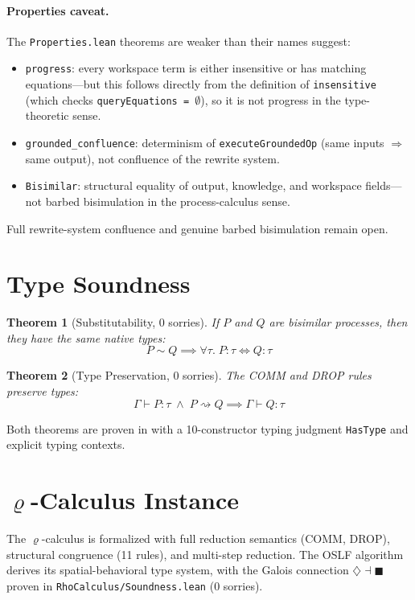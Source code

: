 \documentclass[]{article}
\newtheorem{theorem}{Theorem}
\newcommand{\code}[1]{\texttt{#1}}
\newcommand{\codepath}[1]{\path{#1}}
\newcommand{\rhocalc}{\ensuremath{\varrho}}
\newcommand{\Dia}{\ensuremath{\diamondsuit}}
\newcommand{\Bx}{\ensuremath{\blacksquare}}
\begin{document}
\paragraph{Properties caveat.}
The \code{Properties.lean} theorems are weaker than their names suggest:
\begin{itemize}
\item \code{progress}: every workspace term is either insensitive or has
  matching equations---but this follows directly from the definition of
  \code{insensitive} (which checks \code{queryEquations = $\emptyset$}),
  so it is not progress in the type-theoretic sense.
\item \code{grounded\_confluence}: determinism of \code{executeGroundedOp}
  (same inputs $\Rightarrow$ same output), not confluence of the rewrite
  system.
\item \code{Bisimilar}: structural equality of output, knowledge, and
  workspace fields---not barbed bisimulation in the process-calculus sense.
\end{itemize}
Full rewrite-system confluence and genuine barbed bisimulation remain open.

\section{Type Soundness}

\begin{theorem}[Substitutability, 0 sorries]
If $P$ and $Q$ are bisimilar processes, then they have the same native types:
$$P \sim Q \implies \forall \tau.\; P : \tau \iff Q : \tau$$
\end{theorem}

\begin{theorem}[Type Preservation, 0 sorries]
The COMM and DROP rules preserve types:
$$\Gamma \vdash P : \tau \;\wedge\; P \rightsquigarrow Q \implies \Gamma \vdash Q : \tau$$
\end{theorem}

Both theorems are proven in \codepath{RhoCalculus/Soundness.lean} with
a 10-constructor typing judgment \code{HasType} and explicit typing contexts.

\section{\rhocalc{}-Calculus Instance}

The \rhocalc{}-calculus is formalized with full reduction semantics (COMM, DROP),
structural congruence (11 rules), and multi-step reduction. The OSLF algorithm
derives its spatial-behavioral type system, with the Galois connection
$\Dia \dashv \Bx$ proven in \code{RhoCalculus/Soundness.lean} (0 sorries).
\end{document}
